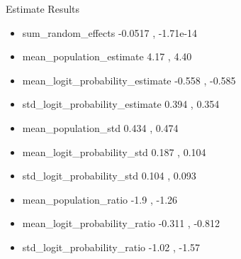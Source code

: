 \documentclass{beamer}
\begin{document}
\begin{frame}{Estimate Results}
\begin{itemize}

\item
sum\_random\_effects
\hspace{4.9em} -0.0517 , -1.71e-14
\pause

\item
mean\_population\_estimate
\hspace{2.5em} 4.17 , 4.40
\pause

\item
mean\_logit\_probability\_estimate
\hspace{0.0em} -0.558 , -0.585
\pause

\item
std\_logit\_probability\_estimate
\hspace{1.3em} 0.394  , 0.354
\pause

\item
mean\_population\_std
\hspace{4.7em} 0.434 , 0.474
\pause

\item
mean\_logit\_probability\_std
\hspace{2.5em} 0.187 , 0.104
\pause

\item
std\_logit\_probability\_std
\hspace{3.5em} 0.104 , 0.093
\pause

\item
mean\_population\_ratio
\hspace{3.7em} -1.9 , -1.26
\pause

\item
mean\_logit\_probability\_ratio
\hspace{1.5em} -0.311 , -0.812
\pause

\item
std\_logit\_probability\_ratio
\hspace{2.5em} -1.02  , -1.57
\pause


\end{itemize}
\end{frame}
\end{document}
